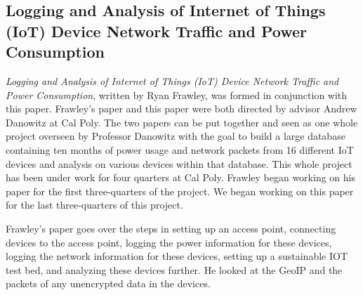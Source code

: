 
\subsection{Logging and Analysis of Internet of Things (IoT) Device Network Traffic and Power Consumption}
\label{frawleyPaper}
\textit{Logging and Analysis of Internet of Things (IoT) Device Network Traffic and Power Consumption}\cite{frawley_2018}, written by Ryan Frawley, was formed in conjunction with this paper. Frawley's paper and this paper were both directed by advisor Andrew Danowitz at Cal Poly. The two papers can be put together and seen as one whole project overseen by Professor Danowitz with the goal to build a large database containing ten months of power usage and network packets from 16 different IoT devices and analysis on various devices within that database. This whole project has been under work for four quarters at Cal Poly. Frawley began working on his paper for the first three-quarters of the project. We began working on this paper for the last three-quarters of this project.

Frawley's paper goes over the steps in setting up an access point, connecting devices to the access point, logging the power information for these devices, logging the network information for these devices, setting up a sustainable IOT test bed, and analyzing these devices further. He looked at the GeoIP\cite{maxmind} and the packets of any unencrypted data in the devices.


